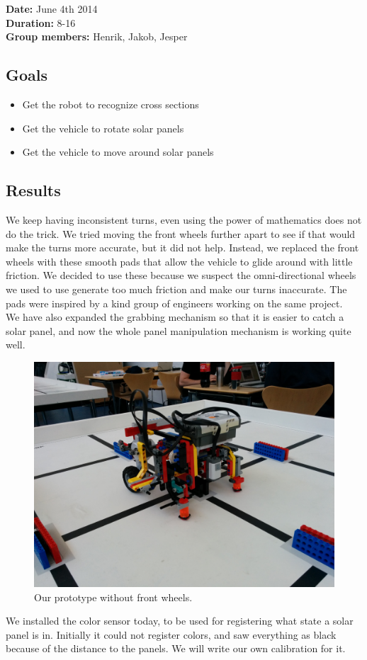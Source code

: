 \textbf{Date:} June 4th 2014\\\textbf{Duration:} 8-16\\\textbf{Group
members:} Henrik, Jakob, Jesper	

\subsection{Goals}

\begin{itemize}
\itemsep1pt\parskip0pt
\item
  Get the robot to recognize cross sections
\item
  Get the vehicle to rotate solar panels
\item
  Get the vehicle to move around solar panels
\end{itemize}

\subsection{Results}

We keep having inconsistent turns, even using the power of mathematics
does not do the trick. We tried moving the front wheels further apart to
see if that would make the turns more accurate, but it did not help.
Instead, we replaced the front wheels with these smooth pads that allow
the vehicle to glide around with little friction. We decided to use
these because we suspect the omni-directional wheels we used to use
generate too much friction and make our turns inaccurate. The pads were
inspired by a kind group of engineers working on the same project.\\We
have also expanded the grabbing mechanism so that it is easier to catch a
solar panel, and now the whole panel manipulation mechanism is working
quite well.
\begin{figure}[hbt]
  \centering
  \includegraphics[scale=0.1]{../experiments/images/betterPrototype.jpg}
  \caption{Our prototype without front wheels.}
\end{figure}
We installed the color sensor today, to be used for registering what state a solar
panel is in. Initially it could not register colors, and saw everything
as black because of the distance to the panels. We will write our own
calibration for it.

